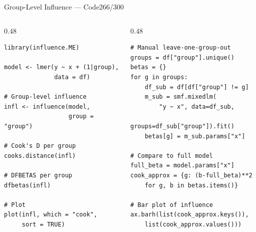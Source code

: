 \documentclass[10pt]{beamer}
\newcommand{\smark}[1]{\hfill{\scriptsize\color{codegray}#1}}
\begin{document}
\begin{frame}[fragile]{Group-Level Influence --- Code}\smark{266/300}
\begin{columns}[T]
\begin{column}{0.48\textwidth}
\begin{lstlisting}[style=Rstyle]
library(influence.ME)

model <- lmer(y ~ x + (1|group),
              data = df)

# Group-level influence
infl <- influence(model,
                  group = "group")

# Cook's D per group
cooks.distance(infl)

# DFBETAS per group
dfbetas(infl)

# Plot
plot(infl, which = "cook",
     sort = TRUE)
\end{lstlisting}
\end{column}
\begin{column}{0.48\textwidth}
\begin{lstlisting}[style=Pystyle]
# Manual leave-one-group-out
groups = df["group"].unique()
betas = {}
for g in groups:
    df_sub = df[df["group"] != g]
    m_sub = smf.mixedlm(
        "y ~ x", data=df_sub,
        groups=df_sub["group"]).fit()
    betas[g] = m_sub.params["x"]

# Compare to full model
full_beta = model.params["x"]
cook_approx = {g: (b-full_beta)**2
    for g, b in betas.items()}

# Bar plot of influence
ax.barh(list(cook_approx.keys()),
    list(cook_approx.values()))
\end{lstlisting}
\end{column}
\end{columns}
\end{frame}
\end{document}
